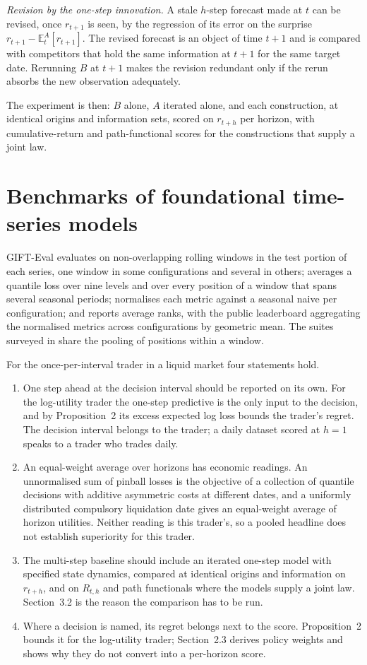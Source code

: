 \documentclass[11pt]{article}
\newcommand{\E}{\mathbb{E}}
\begin{document}
\emph{Revision by the one-step innovation.} A stale $h$-step forecast made at $t$ can be revised, once $r_{t+1}$ is seen, by the regression of its error on the surprise $r_{t+1} - \E^A_t[r_{t+1}]$. The revised forecast is an object of time $t+1$ and is compared with competitors that hold the same information at $t+1$ for the same target date. Rerunning $B$ at $t+1$ makes the revision redundant only if the rerun absorbs the new observation adequately.

The experiment is then: $B$ alone, $A$ iterated alone, and each construction, at identical origins and information sets, scored on $r_{t+h}$ per horizon, with cumulative-return and path-functional scores for the constructions that supply a joint law.

\section{Benchmarks of foundational time-series models}

GIFT-Eval \citep{aksu2024gifteval} evaluates on non-overlapping rolling windows in the test portion of each series, one window in some configurations and several in others; averages a quantile loss over nine levels and over every position of a window that spans several seasonal periods; normalises each metric against a seasonal naive per configuration; and reports average ranks, with the public leaderboard aggregating the normalised metrics across configurations by geometric mean. The suites surveyed in \citet{cotton2026stronger} share the pooling of positions within a window.

For the once-per-interval trader in a liquid market four statements hold.

\begin{enumerate}
\item One step ahead at the decision interval should be reported on its own. For the log-utility trader the one-step predictive is the only input to the decision, and by Proposition~2 its excess expected log loss bounds the trader's regret. The decision interval belongs to the trader; a daily dataset scored at $h = 1$ speaks to a trader who trades daily.
\item An equal-weight average over horizons has economic readings. An unnormalised sum of pinball losses is the objective of a collection of quantile decisions with additive asymmetric costs at different dates, and a uniformly distributed compulsory liquidation date gives an equal-weight average of horizon utilities. Neither reading is this trader's, so a pooled headline does not establish superiority for this trader.
\item The multi-step baseline should include an iterated one-step model with specified state dynamics, compared at identical origins and information on $r_{t+h}$, and on $R_{t,h}$ and path functionals where the models supply a joint law. Section~3.2 is the reason the comparison has to be run.
\item Where a decision is named, its regret belongs next to the score. Proposition~2 bounds it for the log-utility trader; Section~2.3 derives policy weights and shows why they do not convert into a per-horizon score.
\end{enumerate}
\end{document}

